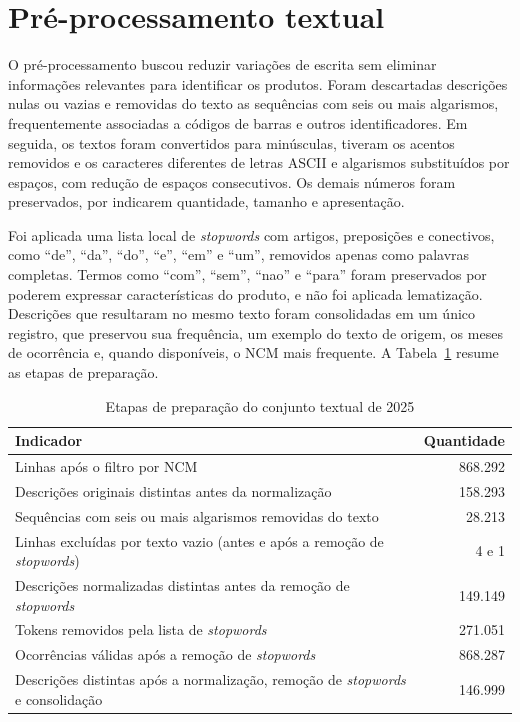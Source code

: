 \documentclass[english,brazilian]{UNISINOSmonografia}
\begin{document}
\section{Pré-processamento textual}
\label{sec:preprocessamento}

O pré-processamento buscou reduzir variações de escrita sem eliminar informações relevantes para identificar os produtos. Foram descartadas descrições nulas ou vazias e removidas do texto as sequências com seis ou mais algarismos, frequentemente associadas a códigos de barras e outros identificadores. Em seguida, os textos foram convertidos para minúsculas, tiveram os acentos removidos e os caracteres diferentes de letras ASCII e algarismos substituídos por espaços, com redução de espaços consecutivos. Os demais números foram preservados, por indicarem quantidade, tamanho e apresentação.

Foi aplicada uma lista local de \textit{stopwords} com artigos, preposições e conectivos, como ``de'', ``da'', ``do'', ``e'', ``em'' e ``um'', removidos apenas como palavras completas. Termos como ``com'', ``sem'', ``nao'' e ``para'' foram preservados por poderem expressar características do produto, e não foi aplicada lematização. Descrições que resultaram no mesmo texto foram consolidadas em um único registro, que preservou sua frequência, um exemplo do texto de origem, os meses de ocorrência e, quando disponíveis, o NCM mais frequente. A Tabela~\ref{tab:preparacao} resume as etapas de preparação.

\begin{table}[!htb]
    \caption{Etapas de preparação do conjunto textual de 2025}
    \label{tab:preparacao}
    \centering
    \small
    \begin{tabularx}{\textwidth}{Xr}
        \hline
        \textbf{Indicador} & \textbf{Quantidade}\\
        \hline
        Linhas após o filtro por NCM & 868.292\\
        Descrições originais distintas antes da normalização & 158.293\\
        Sequências com seis ou mais algarismos removidas do texto & 28.213\\
        Linhas excluídas por texto vazio (antes e após a remoção de \textit{stopwords}) & 4 e 1\\
        Descrições normalizadas distintas antes da remoção de \textit{stopwords} & 149.149\\
        Tokens removidos pela lista de \textit{stopwords} & 271.051\\
        Ocorrências válidas após a remoção de \textit{stopwords} & 868.287\\
        Descrições distintas após a normalização, remoção de \textit{stopwords} e consolidação & 146.999\\
        \hline
    \end{tabularx}
\end{table}
\end{document}
